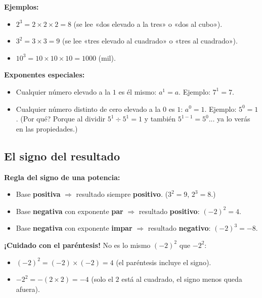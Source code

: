 \documentclass[12pt, letterpaper]{article}
\begin{document}
\noindent\textbf{Ejemplos:}
\begin{itemize}[leftmargin=*]
  \item $2^3 = 2 \times 2 \times 2 = 8$ (se lee «dos elevado a la tres» o «dos al cubo»).
  \item $3^2 = 3 \times 3 = 9$ (se lee «tres elevado al cuadrado» o «tres al cuadrado»).
  \item $10^3 = 10 \times 10 \times 10 = 1000$ (mil).
\end{itemize}

\newpage

\begin{cuadroadvertencia}
  \textbf{Exponentes especiales:}
  \begin{itemize}
    \item Cualquier número elevado a la $1$ es él mismo: $a^1 = a$. Ejemplo: $7^1 = 7$.
    \item Cualquier número distinto de cero elevado a la $0$ es $1$: $a^0 = 1$. Ejemplo: $5^0 = 1$. (\textquestiondown Por qué? Porque al dividir $5^1 \div 5^1 = 1$ y también $5^{1-1} = 5^0$... ya lo verás en las propiedades.)
  \end{itemize}
\end{cuadroadvertencia}

\subsection{El signo del resultado}

\begin{cuadroteoria}
  \textbf{Regla del signo de una potencia:}
  \begin{itemize}
    \item Base \textbf{positiva} $\Rightarrow$ resultado siempre \textbf{positivo}. ($3^2 = 9$, $2^3 = 8$.)
    \item Base \textbf{negativa} con exponente \textbf{par} $\Rightarrow$ resultado \textbf{positivo}: $(-2)^2 = 4$.
    \item Base \textbf{negativa} con exponente \textbf{impar} $\Rightarrow$ resultado \textbf{negativo}: $(-2)^3 = -8$.
  \end{itemize}
\end{cuadroteoria}

\begin{cuadroadvertencia}
  \textbf{¡Cuidado con el paréntesis!} No es lo mismo $(-2)^2$ que $-2^2$:
  \begin{itemize}
    \item $(-2)^2 = (-2) \times (-2) = 4$ (el paréntesis incluye el signo).
    \item $-2^2 = -(2 \times 2) = -4$ (solo el $2$ está al cuadrado, el signo menos queda afuera).
  \end{itemize}
\end{cuadroadvertencia}
\end{document}
